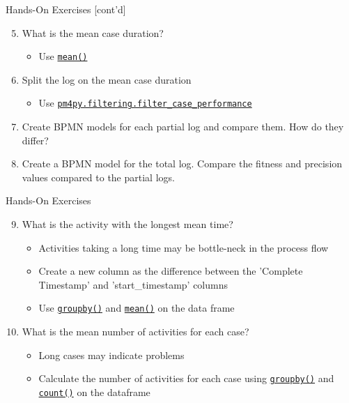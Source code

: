 \documentclass[ignorenonframetext,xcolor=x11names]{beamer}
\begin{document}
\begin{frame}{Hands-On Exercises \small [cont'd]}
\begin{enumerate}
    \setcounter{enumi}{4}
    \item What is the mean case duration? 
    \begin{itemize}
       \item Use \href{https://pandas.pydata.org/docs/reference/api/pandas.DataFrame.mean.html}{\texttt{mean()}}
    \end{itemize}
    \item Split the log on the mean case duration
    \begin{itemize}
       \item Use \href{https://processintelligence.solutions/static/api/2.7.11/generated/pm4py.filtering.filter_case_performance.html}{\texttt{pm4py.filtering.filter\_case\_performance}}
    \end{itemize}
    \item Create BPMN models for each partial log and compare them. How do they differ?
    \item Create a BPMN model for the total log. Compare the fitness and precision values compared to the partial logs.
\end{enumerate}
\end{frame}

\begin{frame}{Hands-On Exercises}
\begin{enumerate}
   \setcounter{enumi}{8}
   \item What is the activity with the longest mean time?
   \begin{itemize}
       \item Activities taking a long time may be bottle-neck in the process flow
       \item Create a new column as the difference between the 'Complete Timestamp' and 'start\_timestamp' columns
       \item Use \href{https://pandas.pydata.org/docs/reference/api/pandas.DataFrame.groupby.html}{\texttt{groupby()}} and \href{https://pandas.pydata.org/docs/reference/api/pandas.DataFrame.mean.html}{\texttt{mean()}} on the data frame
   \end{itemize}
   \item What is the mean number of activities for each case?
   \begin{itemize}
       \item Long cases may indicate problems
       \item Calculate the number of activities for each case using \href{https://pandas.pydata.org/docs/reference/api/pandas.DataFrame.groupby.html}{\texttt{groupby()}} and \href{https://pandas.pydata.org/docs/reference/api/pandas.DataFrame.count.html}{\texttt{count()}} on the dataframe
   \end{itemize}
\end{enumerate}
\end{frame}
\end{document}
